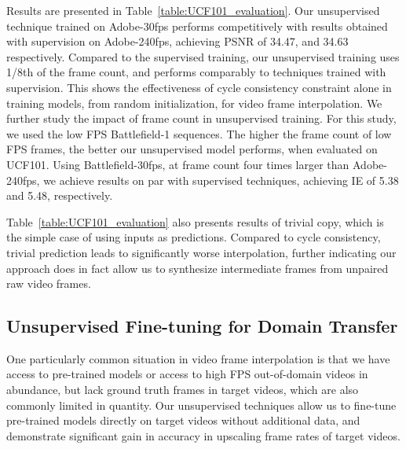 \documentclass[10pt,twocolumn,letterpaper]{article}
\begin{document}
Results are presented in Table~\ref{table:UCF101_evaluation}.
Our unsupervised technique trained on Adobe-30fps performs competitively with results obtained with supervision on Adobe-240fps, achieving PSNR of 34.47, and 34.63 respectively.
Compared to the supervised training, our unsupervised training uses 1/8th of the frame count, and performs comparably to techniques trained with supervision. This shows the effectiveness of cycle consistency constraint alone in training models, from random initialization, for video frame interpolation.
We further study the impact of frame count in unsupervised training. For this study, we used the low FPS Battlefield-1 sequences. The higher the frame count of low FPS frames, the better our unsupervised model performs, when evaluated on UCF101. Using Battlefield-30fps, at frame count four times larger than Adobe-240fps, we achieve results on par with supervised techniques, achieving IE of 5.38 and 5.48, respectively.

Table~\ref{table:UCF101_evaluation} also presents results of trivial copy, which is the simple case of using inputs as predictions. Compared to cycle consistency, trivial prediction leads to significantly worse interpolation, further indicating our approach does in fact allow us to synthesize intermediate frames from unpaired raw video frames.

\subsection{Unsupervised Fine-tuning for Domain Transfer}\label{domain_transfer}

One particularly common situation in video frame interpolation is that we have access to pre-trained models or access to high FPS out-of-domain videos in abundance, but lack ground truth frames in target videos, which are also commonly limited in quantity. Our unsupervised techniques allow us to fine-tune pre-trained models directly on target videos without additional data, and demonstrate significant gain in accuracy in upscaling frame rates of target videos.
\end{document}
